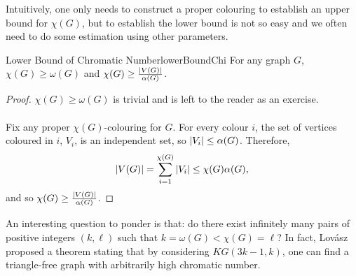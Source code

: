 \documentclass[math]{amznotes}
\theoremstyle{remark}
\newcommand{\0}{\mathbf{0}}
\newcommand{\1}{\mathbf{1}}
\begin{document}
Intuitively, one only needs to construct a proper colouring to establish an upper bound for $\chi(G)$, but to establish the lower bound is not so easy and we often need to do some estimation using other parameters.
\begin{probox}{Lower Bound of Chromatic Number}{lowerBoundChi}
    For any graph $G$, $\chi(G) \geq \omega(G)$ and $\chi(G) \geq \frac{{\left\lvert {V(G)} \right\rvert}}{\alpha(G)}$.
    \tcblower
    \begin{proof}
        $\chi(G) \geq \omega(G)$ is trivial and is left to the reader as an exercise.
        \\\\
        Fix any proper $\chi(G)$-colouring for $G$. For every colour $i$, the set of vertices coloured in $i$, $V_i$, is an independent set, so ${\left\lvert {V_i} \right\rvert} \leq \alpha(G)$. Therefore,
        \begin{equation*}
            {\left\lvert {V(G)} \right\rvert} = \sum_{i = 1}^{\chi(G)}{\left\lvert {V_i} \right\rvert} \leq \chi(G)\alpha(G),
        \end{equation*}
        and so $\chi(G) \geq \frac{{\left\lvert {V(G)} \right\rvert}}{\alpha(G)}$.
    \end{proof}
\end{probox}
An interesting question to ponder is that: do there exist infinitely many pairs of positive integers $(k, \ell)$ such that $k = \omega(G) < \chi(G) = \ell$? In fact, Lov\'{a}sz proposed a theorem stating that by considering $KG(3k - 1, k)$, one can find a triangle-free graph with arbitrarily high chromatic number.
\end{document}

